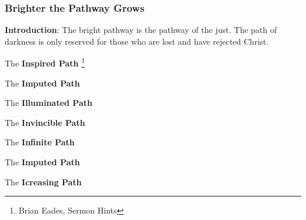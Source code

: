 
\subsubsection{Brighter the Pathway Grows}
\textbf{Introduction}: The bright pathway is the pathway of the just. The path of darkness is only reserved for those who are lost and have rejected Christ.
\begin{compactenum}[I.][4]
	\item The \textbf{Inspired Path} \footnote{Brian Eades, Sermon Hints}
	\item The \textbf{Imputed Path}
	\item The \textbf{Illuminated Path}
	\item The \textbf{Invincible Path}
	\item The \textbf{Infinite Path}
	\item The \textbf{Imputed Path}
	\item The \textbf{Icreasing Path}
\end{compactenum}

